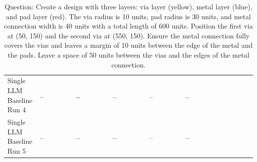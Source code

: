 \begin{table}
\begin{tabular}{@{}mmmmmm@{}}
    \makecell{Single LLM \\ Baseline \\ Run 4} & \includegraphics[width=0.13\textwidth]{./run_4/png/gpt-4o_results/ViaConnection.png} & \includegraphics[width=0.13\textwidth]{./run_4/png/o1-preview_results/ViaConnection.png} & \includegraphics[width=0.13\textwidth]{./run_4/png/claude-3-5-sonnet-20240620_results/ViaConnection.png} & \includegraphics[width=0.13\textwidth]{./run_4/png/watsonx_meta-llama_llama-3-1-70b-instruct_results/ViaConnection.png} & \includegraphics[width=0.13\textwidth]{./run_4/png/watsonx_meta-llama_llama-3-405b-instruct_results/ViaConnection.png} \\
    \makecell{Single LLM \\ Baseline \\ Run 5} & \includegraphics[width=0.13\textwidth]{./run_5/png/gpt-4o_results/ViaConnection.png} & \includegraphics[width=0.13\textwidth]{./run_5/png/o1-preview_results/ViaConnection.png} & \includegraphics[width=0.13\textwidth]{./run_5/png/claude-3-5-sonnet-20240620_results/ViaConnection.png} & \includegraphics[width=0.13\textwidth]{./run_5/png/watsonx_meta-llama_llama-3-1-70b-instruct_results/ViaConnection.png} & \includegraphics[width=0.13\textwidth]{./run_5/png/watsonx_meta-llama_llama-3-405b-instruct_results/ViaConnection.png} \\
    \bottomrule
  \end{tabular}
  \caption*{Question: Create a design with three layers: via layer (yellow), metal layer (blue), and pad layer (red). The via radius is 10 units, pad radius is 30 units, and metal connection width is 40 units with a total length of 600 units. Position the first via at (50, 150) and the second via at (550, 150). Ensure the metal connection fully covers the vias and leaves a margin of 10 units between the edge of the metal and the pads. Leave a space of 50 units between the vias and the edges of the metal connection.}
\end{table}

